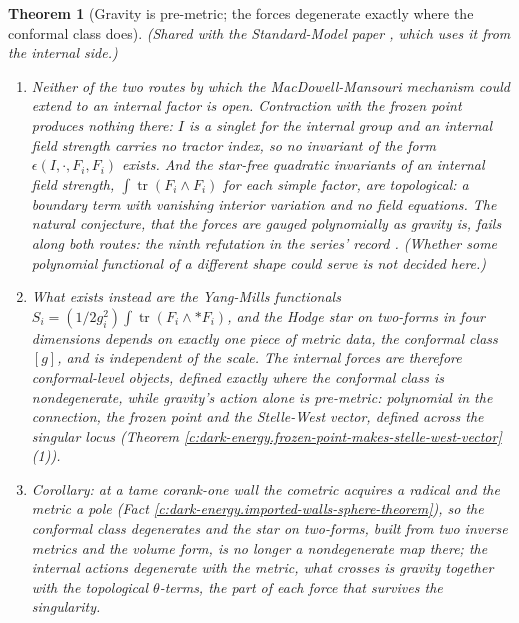 \documentclass[11pt]{article}
\newtheorem{theorem}{Theorem}[section]
\theoremstyle{definition}
\theoremstyle{plain}
\newcommand{\changedmark}[2]{\marginpar{\raggedright\scriptsize\color{#1}#2}}
\providecommand{\tr}{}\renewcommand{\tr}{\operatorname{tr}}
\begin{document}
\begin{theorem}[Gravity is pre-metric; the forces degenerate exactly where the conformal class does]\label{c:dark-energy.gravity-pre-metric-forces-degenerate-exactly}
\changedmark{gray}{reworded}
(Shared with the Standard-Model paper \cite{ButlerT12}, which uses it from the internal side.)
\begin{enumerate}
\item Neither of the two routes by which the MacDowell-Mansouri mechanism could extend to an internal factor is open. Contraction with the frozen point produces nothing there: $I$ is a singlet for the internal group and an internal field strength carries no tractor index, so no invariant of the form $\epsilon(I, \cdot, F_i, F_i)$ exists. And the star-free quadratic invariants of an internal field strength, $\int\tr(F_i\wedge F_i)$ for each simple factor, are topological: a boundary term with vanishing interior variation and no field equations. The natural conjecture, that the forces are gauged polynomially as gravity is, fails along both routes: the ninth refutation in the series' record \cite[Table~1, row 9]{ButlerT17}. (Whether some polynomial functional of a different shape could serve is not decided here.)
\item What exists instead are the Yang-Mills functionals $S_i = (1/2g_i^2)\int \tr(F_i \wedge {*}F_i)$, and the Hodge star on two-forms in four dimensions depends on exactly one piece of metric data, the conformal class $[g]$, and is independent of the scale. The internal forces are therefore \emph{conformal-level} objects, defined exactly where the conformal class is nondegenerate, while gravity's action alone is \emph{pre-metric}: polynomial in the connection, the frozen point and the Stelle-West vector, defined across the singular locus (Theorem \ref{c:dark-energy.frozen-point-makes-stelle-west-vector}(1)).
\item Corollary: at a tame corank-one wall the cometric acquires a radical and the metric a pole (Fact \ref{c:dark-energy.imported-walls-sphere-theorem}), so the conformal class degenerates and the star on two-forms, built from two inverse metrics and the volume form, is no longer a nondegenerate map there; the internal actions degenerate with the metric, what crosses is gravity together with the topological $\theta$-terms, the part of each force that survives the singularity.
\end{enumerate}
\end{theorem}
\end{document}
